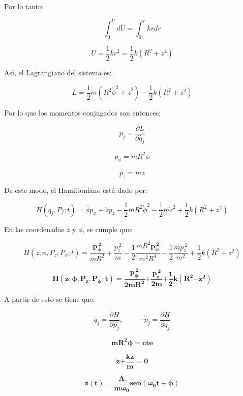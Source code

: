 \documentclass[]{article}
\begin{document}
Por lo tanto:

\[\int_{0}^{U}{dU} = \int_{0}^{r}{krdr}\]

\[U = \frac{1}{2}kr^{2} = \frac{1}{2}k\left( R^{2} + z^{2} \right)\]

Así, el Lagrangiano del sistema es:

\[L = \frac{1}{2}m\left( R^{2}{\dot{\phi}}^{2} + {\dot{z}}^{2} \right) - \frac{1}{2}k\left( R^{2} + z^{2} \right)\]

Por lo que los momentos conjugados son entonces:

\[p_{j} = \frac{\partial L}{\partial\dot{q_{j}}}\]

\[p_{\phi} = mR^{2}\dot{\phi}\]

\[p_{z} = m\dot{z}\]

De este modo, el Hamiltoniano está dado por:

\[H\left( q_{j},P_{j};t \right) = \dot{\phi}p_{\phi} + \dot{z}p_{z} - \frac{1}{2}mR^{2}{\dot{\phi}}^{2} - \frac{1}{2}m{\dot{z}}^{2} + \frac{1}{2}k\left( R^{2} + z^{2} \right)\]

En las coordenadas \(z\) y \(\phi\), se cumple que:

\[H\left( z,\phi,P_{z},P_{\phi};t \right) = \frac{\mathbf{p}_{\mathbf{\phi}}^{\mathbf{\ 2}}}{mR^{2}} + \frac{p_{z}^{\ 2}}{m} - \frac{1}{2}\frac{mR^{2}\mathbf{p}_{\mathbf{\phi}}^{\mathbf{\ 2}}}{m^{2}R^{4}} - \frac{1}{2}\frac{mp_{z}^{\ 2}}{m^{2}} + \frac{1}{2}k\left( R^{2} + z^{2} \right)\]

\[\mathbf{H}\left( \mathbf{z,\phi,}\mathbf{P}_{\mathbf{z}}\mathbf{,}\mathbf{P}_{\mathbf{\phi}}\mathbf{;t} \right)\mathbf{=}\frac{\mathbf{p}_{\mathbf{\phi}}^{\mathbf{\ 2}}}{\mathbf{2}\mathbf{m}\mathbf{R}^{\mathbf{2}}}\mathbf{+}\frac{\mathbf{p}_{\mathbf{z}}^{\mathbf{\ 2}}}{\mathbf{2}\mathbf{m}}\mathbf{+}\frac{\mathbf{1}}{\mathbf{2}}\mathbf{k}\left( \mathbf{R}^{\mathbf{2}}\mathbf{+}\mathbf{z}^{\mathbf{2}} \right)\]

A partir de esto se tiene que:

\[{\dot{q}}_{j} = \frac{\partial H}{\partial p_{j}},\ \ \ \ \ \ \ \ \ \ {- \dot{p}}_{j} = \frac{\partial H}{\partial q_{j}}\]

\[\mathbf{m}\mathbf{R}^{\mathbf{2}}\dot{\mathbf{\phi}}\mathbf{= cte}\]

\[\ddot{\mathbf{z}}\mathbf{+}\frac{\mathbf{kz}}{\mathbf{m}}\mathbf{= 0}\]

\[\mathbf{z}\left( \mathbf{t} \right)\mathbf{=}\frac{\mathbf{A}}{\mathbf{m}\mathbf{\omega}_{\mathbf{0}}}\mathbf{sen}\left( \mathbf{\omega}_{\mathbf{0}}\mathbf{t + \phi} \right)\]
\end{document}
